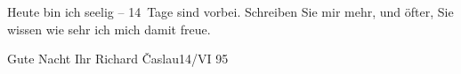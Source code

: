 \pstart
           {\pb}Heute bin ich seelig – 14 Tage
               sind vorbei. Schreiben Sie mir mehr, und öfter, Sie wissen wie sehr ich mich damit
               freue.\pend
           
\pstart
           Gute Nacht\pend
           \pstart Ihr \spacefill\mbox{Richard}\pend{}
\pstart
           Časlau14/VI 95\pend
           \endnumbering{}  \newcommand{\dateiname}{L00453}\newcommand{\titel}{Richard Beer-Hofmann an Arthur Schnitzler, 14. 6. 1895}\newcommand{\editorInnen}{Martin Anton Müller und Gerd-Hermann Susen}

